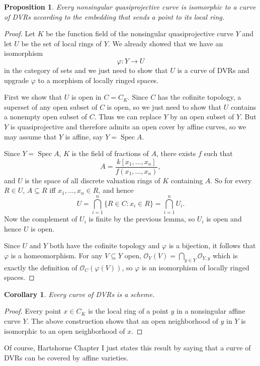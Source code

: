 \documentclass[reqno,12pt,letterpaper]{amsart}
\DeclareMathOperator{\Spec}{Spec}
\newcommand{\Olo}{\mathscr O}
\newtheorem{proposition}[theorem]{Proposition}
\newtheorem{corollary}[theorem]{Corollary}
\theoremstyle{definition}
\begin{document}
\begin{proposition}
Every nonsingular quasiprojective curve is isomorphic to a curve of DVRs according to the embedding that sends a point to its local ring.
\end{proposition}
\begin{proof}
Let $K$ be the function field of the nonsingular quasiprojective curve $Y$ and let $U$ be the set of local rings of $Y$.
We already showed that we have an isomorphism
$$\varphi: Y \to U$$
in the category of sets and we just need to show that $U$ is a curve of DVRs and upgrade $\varphi$ to a morphism of locally ringed spaces.

First we show that $U$ is open in $C = C_K$.
Since $C$ has the cofinite topology, a superset of any open subset of $C$ is open, so we just need to show that $U$ contains a nonempty open subset of $C$.
Thus we can replace $Y$ by an open subset of $Y$.
But $Y$ is quasiprojective and therefore admits an open cover by affine curves, so we may assume that $Y$ is affine, say $Y = \Spec A$.

Since $Y = \Spec A$, $K$ is the field of fractions of $A$, there exists $f$ such that
$$A = \frac{k[x_1, \dots, x_n]}{f(x_1, \dots, x_n)},$$
and $U$ is the space of all discrete valuation rings of $K$ containing $A$.
So for every $R \in U$, $A \subseteq R$ iff $x_1, \dots, x_n \in R$, and hence
$$U = \bigcap_{i=1}^n \{R \in C: x_i \in R\} = \bigcap_{i=1}^n U_i.$$
Now the complement of $U_i$ is finite by the previous lemma, so $U_i$ is open and hence $U$ is open.

Since $U$ and $Y$ both have the cofinite topology and $\varphi$ is a bijection, it follows that $\varphi$ is a homeomorphism.
For any $V \subseteq Y$ open, $\Olo_Y(V) = \bigcap_{y \in Y} \Olo_{Y,y}$ which is exactly the definition of $\Olo_C(\varphi(V))$, so $\varphi$ is an isomorphism of locally ringed spaces.
\end{proof}

\begin{corollary}
Every curve of DVRs is a scheme.
\end{corollary}
\begin{proof}
Every point $x \in C_K$ is the local ring of a point $y$ in a nonsingular affine curve $Y$.
The above construction shows that an open neighborhood of $y$ in $Y$ is isomorphic to an open neighborhood of $x$.
\end{proof}

Of course, Hartshorne Chapter I just states this result by saying that a curve of DVRs can be covered by affine varieties.
\end{document}
